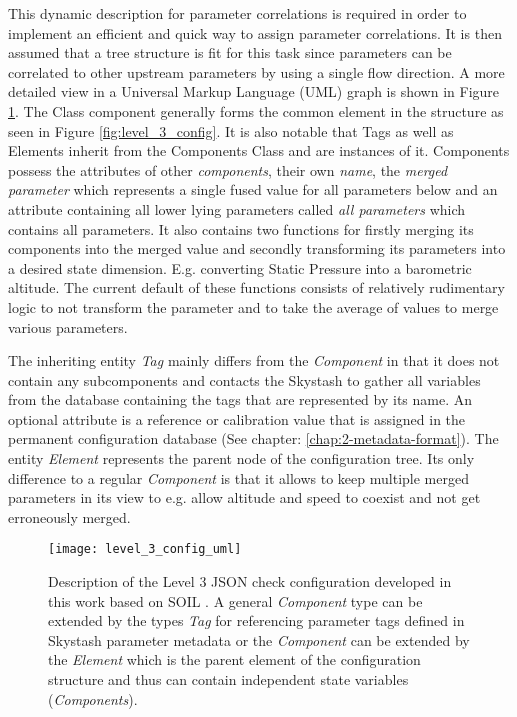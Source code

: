This dynamic description for parameter correlations is required in order to implement an efficient and quick way to assign parameter correlations. It is then assumed that a tree structure is fit for this task since parameters can be correlated to other upstream parameters by using a single flow direction. A more detailed view in a Universal Markup Language (UML) graph is shown in Figure \ref{fig:level_3_config_uml}. The Class component generally forms the common element in the structure as seen in Figure \ref{fig:level_3_config}. It is also notable that Tags as well as Elements inherit from the Components Class and are instances of it. Components possess the attributes of other \textit{components}, their own \textit{name}, the \textit{merged parameter} which represents a single fused value for all parameters below and an attribute containing all lower lying parameters called \textit{all parameters} which contains all parameters. It also contains two functions for firstly merging its components into the merged value and secondly transforming its parameters into a desired state dimension. E.g. converting Static Pressure into a barometric altitude. The current default of these functions consists of relatively rudimentary logic to not transform the parameter and to take the average of values to merge various parameters.

The inheriting entity \textit{Tag} mainly differs from the \textit{Component} in that it does not contain any subcomponents and contacts the Skystash to gather all variables from the database containing the tags that are represented by its name. An optional attribute is a reference or calibration value that is assigned in the permanent configuration database (See chapter: \ref{chap:2-metadata-format}).
The entity \textit{Element} represents the parent node of the configuration tree. Its only difference to a regular \textit{Component} is that it allows to keep multiple merged parameters in its view to e.g. allow altitude and speed to coexist and not get erroneously merged.

\begin{figure}
    \centering
    \texttt{[image: level\_3\_config\_uml]}
    \caption[Level 3 Parity UML configuration description]{Description of the Level 3 JSON check configuration developed in this work based on SOIL \cite{behrens_domain-specific_2021}. A general \textit{Component} type can be extended by the types \textit{Tag} for referencing parameter tags defined in Skystash parameter metadata or the \textit{Component} can be extended by the \textit{Element} which is the parent element of the configuration structure and thus can contain independent state variables (\textit{Components}).}
    \label{fig:level_3_config_uml}
\end{figure}

